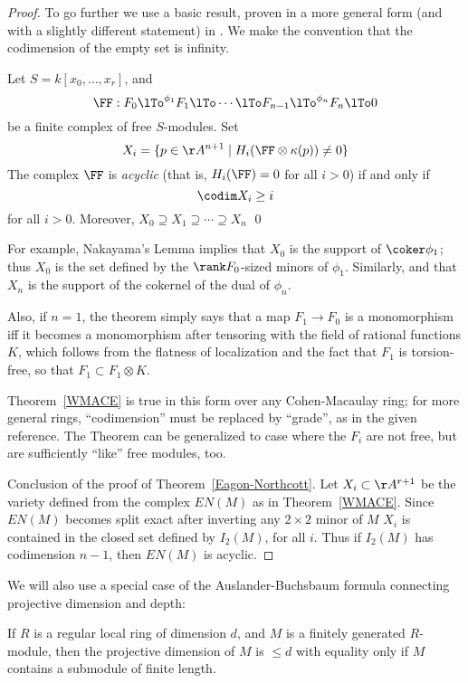 \begin{proof}
To go further we use a basic result, proven in a more general form (and with a slightly different statement) in \cite[Theorem ***]{WMACE}. We make the convention
that the codimension of the empty set is infinity.

\begin{theorem}\label{WMACE}
 Let $S = k[x_0,\dots, x_r]$, and
 $$ 
\FF:  F_0\lTo^{\phi_1}F_1 \lTo \cdots \lTo F_{n-1}\lTo^{\phi_n} F_n\lTo 0
 $$
be a finite complex of free $S$-modules. Set
$$
X_i = \{p\in \AA^{n+1} \mid  H_i(\FF \otimes \kappa(p)) \neq 0\}
$$
The complex $\FF$ is \emph{acyclic} (that is, $H_i(\FF) = 0$ for all $i>0$) if and only if
$$
\codim X_i \geq i
$$
for all $i>0$. Moreover, $X_{0}\supseteq X_{1}\supseteq \cdots \supseteq X_{n}$
\qed
\end{theorem}

For example, Nakayama's Lemma implies that $X_{0}$ is the support of $\coker \phi_{1}$; thus $X_{0}$ is the set defined by the $\rank F_{0}$-sized minors of $\phi_{1}$. Similarly, 
and that $X_{n}$ is the support of the cokernel of the dual of $\phi_{n}$. 

Also, if $n=1$, the theorem simply says that a map $F_1\to F_0$ is a monomorphism iff it becomes a monomorphism after tensoring with the field of rational functions $K$, which follows from the flatness of
localization and the fact that $F_1$ is torsion-free, so that
$F_1 \subset F_1 \otimes K$. 

\begin{fact}
Theorem~\ref{WMACE} is true in this form over any Cohen-Macaulay ring; for more general
rings, ``codimension'' must be replaced by ``grade'', as in the given reference.
The Theorem can be generalized
to case where the $F_i$ are not free, but are sufficiently ``like'' free modules, too.
\end{fact}

Conclusion of the proof of Theorem~\ref{Eagon-Northcott}.
Let $X_{i}\subset \AA^{r+1}$ be the variety defined from the complex $EN(M)$ as in 
Theorem~\ref{WMACE}. Since $EN(M)$ becomes split exact after inverting any $2\times 2$ minor of $M$
$X_{i}$ is
contained in the closed set defined by $I_{2}(M)$, for all $i$. Thus if $I_{2}(M)$ has codimension $n-1$,
then $EN(M)$ is acyclic. 
\end {proof}

We will also use a special case of the Auslander-Buchsbaum formula connecting projective dimension and depth:

\begin{theorem}\label{Auslander-Buchsbaum}
If $R$ is a regular local ring of dimension $d$, and $M$ is a finitely generated $R$-module, then the projective dimension of $M$ is $\leq d$ with equality only if
$M$ contains a submodule of finite length. 
\end{theorem}

